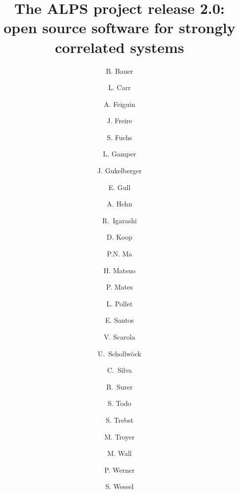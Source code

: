 \documentclass[3p,twocolumn]{elsarticle}
\begin{document}
\begin{frontmatter}

\title{The ALPS project release 2.0: \\ open source software for strongly correlated systems}

\author[eth]{B. Bauer} 
\author[colorado]{L. Carr} 
\author[wyoming]{A. Feiguin} 
\author[utah]{J. Freire} 
\author[goettingen]{S. Fuchs} 
\author[eth]{L. Gamper} 
\author[eth]{J. Gukelberger} 
\author[columbia]{E. Gull} 
\author[eth]{A. Hehn} 
\author[japan]{R.~Igarashi} 
\author[utah]{D. Koop} 
\author[eth]{P.N. Ma} 
\author[tokyo]{H. Matsuo} 
\author[eth,utah]{P. Mates} 
\author[harvard,eth]{L. Pollet} 
\author[brazil,utah]{E. Santos} 
\author[virginia]{V. Scarola} 
\author[lmu]{U.~Schollw\"ock} 
\author[utah]{C.~Silva} 
\author[eth]{B.~Surer} 
\author[tokyo]{S. Todo} 
\author[stationq]{S. Trebst} 
\author[eth]{M. Troyer}
\author[Colorado]{M. Wall} 
\author[eth]{P. Werner} 
\author[rwth,stuttgart]{S. Wessel} 

\address[eth]{Theoretische Physik, ETH Zurich, 8093 Zurich, Switzerland}
\address[colorado] {}
\address[wyoming]{}
\address[utah]{}
\address[goettingen]{Institut f\"ur Theoretische Physik, Georg-August-Universit\"{a}t G\"{o}ttingen, G\"{o}ttingen, Germany}
\address[columbia]{Columbia University, New York, NY 10027, USA}
\address[harvard]{} 
\address[brazil]{} 
\address[virginia]{}
\address[lmu]{}
\address[tokyo]{Department of Applied Physics, University of Tokyo, 113-8656 Tokyo, Japan}
\address[stationq]{Microsoft Research, Station Q, University of California, Santa Barbara, CA 93106, USA}
\address[rwth]{}
\address[stuttgart]{Institut f\"ur Theoretische Physik III, Universit\"at Stuttgart, Pfaffenwaldring 57, D-70550 Stuttgart, Germany}


\end{frontmatter}
\end{document}
